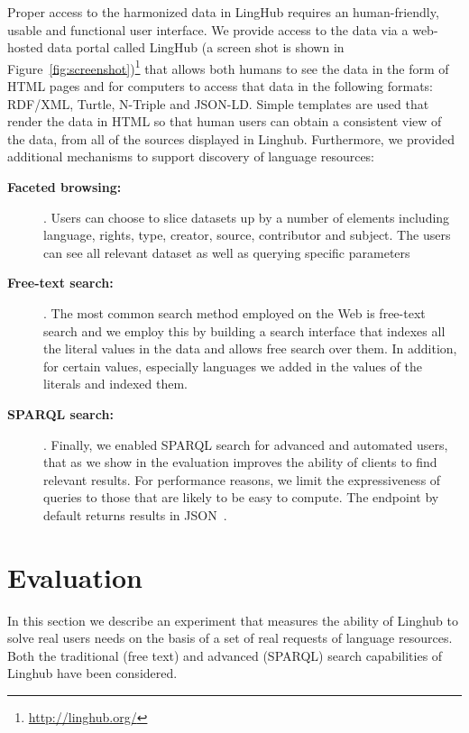 \documentclass[smallextended]{svjour3}       %
\begin{document}
Proper access to the harmonized data in LingHub requires an human-friendly, usable and functional user interface.
We provide access to the data via a web-hosted data portal called LingHub (a screen shot is shown in
Figure~\ref{fig:screenshot})\footnote{\url{http://linghub.org/}}
that allows both humans to see the data in the form of HTML
pages and for computers to access that data in the following formats: RDF/XML,
Turtle, N-Triple and JSON-LD\@. Simple templates are used that render the data in
HTML so that human users can obtain a consistent view of the data, from all of
the sources displayed in Linghub. Furthermore, we provided additional
mechanisms to support discovery of language resources:

\begin{description}
    \item[\textbf{Faceted browsing:}]. Users can choose to slice datasets up by a number of
        elements including language, rights, type, creator, source, contributor
        and subject. The users can see all relevant dataset as well as querying
        specific parameters
    \item[\textbf{Free-text search:}]. The most common search method employed on the Web is
        free-text search and we employ this by building a search interface that 
        indexes all the literal values in the data and allows free search over
        them. In addition, for certain values, especially languages we added in
        the values of the literals and indexed them.
    \item[\textbf{SPARQL search:}]. Finally, we enabled SPARQL search for advanced and
        automated users, that as we show in the evaluation improves the ability
        of clients to find relevant results. For performance reasons, we limit
        the expressiveness of queries to those that are likely to be easy to
        compute. The endpoint by default returns results in
        JSON~\cite{seaborne2013sparql}.
\end{description}

\section{Evaluation}
\label{evaluation}

In this section we describe an experiment that measures the ability of Linghub to solve real users needs on the basis of a set of real requests of language resources. 
Both the traditional (free text) and advanced (SPARQL) search capabilities of Linghub have been considered.
\end{document}
